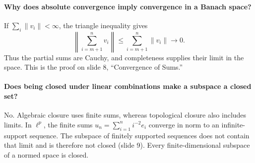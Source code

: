 \documentclass[10pt,english]{article}
\begin{document}
\paragraph{Why does absolute convergence imply convergence in a Banach space?}
If $\sum_i\|v_i\|<\infty$, the triangle inequality gives
\[
\left\|\sum_{i=m+1}^n v_i\right\|\leq\sum_{i=m+1}^n\|v_i\|\longrightarrow0.
\]
Thus the partial sums are Cauchy, and completeness supplies their limit in the space.
This is the proof on slide 8, ``Convergence of Sums.''

\paragraph{Does being closed under linear combinations make a subspace a closed set?}
No. Algebraic closure uses finite sums, whereas topological closure also includes limits.
In $\ell^p$, the finite sums $u_n=\sum_{i=1}^n i^{-2}e_i$ converge in norm to an infinite-support sequence.
The subspace of finitely supported sequences does not contain that limit and is therefore not closed (slide 9).
Every finite-dimensional subspace of a normed space is closed.
\end{document}
